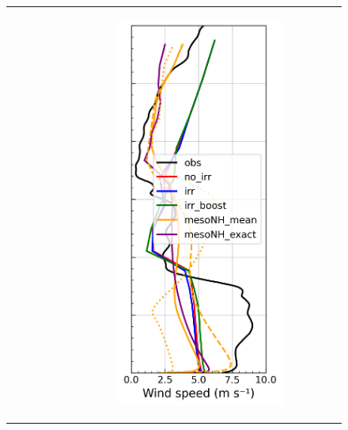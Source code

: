 \begin{figure}[hbtp]
{\begin{tabular}{@{}cccc@{}}
\begin{subfigure}[t]{0.283\textwidth}
        \end{subfigure} &
        \begin{subfigure}[t]{0.283\textwidth}
            \caption{}
            \includegraphics[width=\textwidth]{images/chap6/profiles/profile_elsplans_wind_speed_2007_sensbins.png}

\end{subfigure}
\end{tabular}}
\end{figure}
